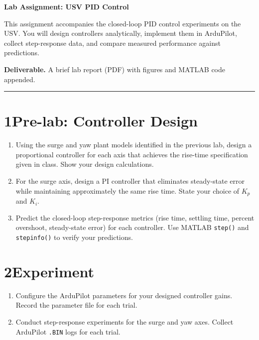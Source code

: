 \documentclass[11pt]{article}
\begin{document}
\begin{center}
  \Large{\bf{Lab Assignment: USV PID Control}}
\end{center}

This assignment accompanies the closed-loop PID control experiments on the USV.
You will design controllers analytically, implement them in ArduPilot, collect
step-response data, and compare measured performance against predictions.

\textbf{Deliverable.}  A brief lab report (PDF) with figures and MATLAB code
appended.

\bigskip\hrule\bigskip

\section*{1\quad Pre-lab: Controller Design}

\begin{enumerate}

\item Using the surge and yaw plant models identified in the previous lab,
  design a proportional controller for each axis that achieves the rise-time
  specification given in class.  Show your design calculations.

\item For the surge axis, design a PI controller that eliminates steady-state
  error while maintaining approximately the same rise time.  State your choice
  of $K_p$ and $K_i$.

\item Predict the closed-loop step-response metrics (rise time, settling time,
  percent overshoot, steady-state error) for each controller.  Use MATLAB
  \texttt{step()} and \texttt{stepinfo()} to verify your predictions.

\end{enumerate}

\section*{2\quad Experiment}

\begin{enumerate}[resume]

\item Configure the ArduPilot parameters for your designed controller gains.
  Record the parameter file for each trial.

\item Conduct step-response experiments for the surge and yaw axes.
  Collect ArduPilot \texttt{.BIN} logs for each trial.

\end{enumerate}
\end{document}
